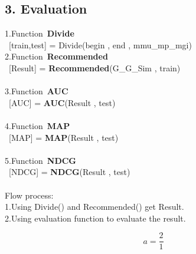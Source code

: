 \documentclass{ctexart}
\begin{document}
\begin{CJK}{GBK}{song}
\subsection*{3. Evaluation}
1.Function\ \textbf{Divide}\\
\ [train,test] = Divide(begin , end , mmu\_mp\_mgi)\\
2.Function\ \textbf{Recommended}\\
\ [Result] =  \textbf{Recommended}(G\_G\_Sim , train)\\\\
3.Function\ \textbf{AUC}\\
\ [AUC] = \textbf{AUC}(Result , test)\\\\
4.Function\ \textbf{MAP}\\
\ [MAP] = \textbf{MAP}(Result , test)\\\\
5.Function\ \textbf{NDCG}\\
\ [NDCG] = \textbf{NDCG}(Result , test)\\\\


Flow process:\\
1.Using Divide() and Recommended() get Result.\\
2.Using evaluation function to evaluate the result.

\begin{equation*}
a=\frac{2}{1}
\end{equation*}

\end{CJK}
\end{document}
